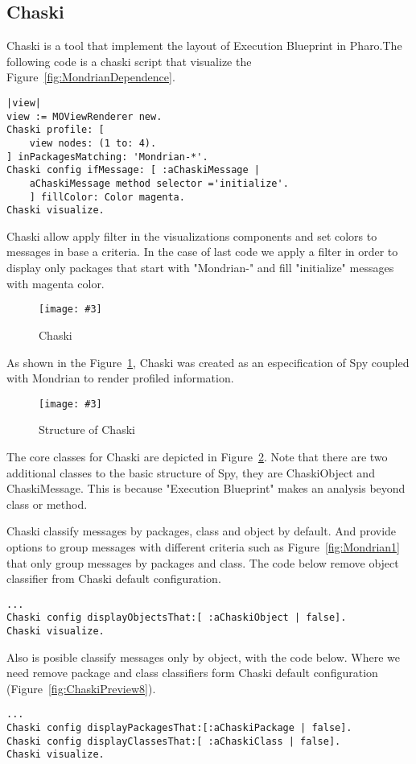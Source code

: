 \documentclass{sig-alternate}
\newcommand{\fig}[4]{
	\begin{figure}[#1]
		\centering
		\texttt{[image: \#3]}
		\caption{\label{fig:#3}#4}
	\end{figure}}
\newcommand{\figref}[1]{Figure~\ref{fig:#1}}
\begin{document}
\subsection{Chaski}

Chaski is a tool that implement the layout of Execution Blueprint in Pharo.The following code is a chaski script that visualize the \figref{MondrianDependence}.
 
\begin{lstlisting}[language=Smalltalk]
|view|
view := MOViewRenderer new. 
Chaski profile: [ 	
	view nodes: (1 to: 4). 
] inPackagesMatching: 'Mondrian-*'.
Chaski config ifMessage: [ :aChaskiMessage | 
	aChaskiMessage method selector ='initialize'.
	] fillColor: Color magenta.
Chaski visualize.
\end{lstlisting}

Chaski allow apply filter in the visualizations components and set colors to messages in base a criteria. In the case of last code we apply a filter in order to display only packages that start with "Mondrian-" and fill "initialize" messages with magenta color.

\fig{}{0.3}{Architecture}{Chaski}

As shown in the \figref{Architecture}, Chaski was created as an especification of Spy coupled with Mondrian to render profiled information.

\fig{}{0.5}{ObjectModel}{Structure of Chaski}

The core classes for Chaski are depicted in \figref{ObjectModel}. Note that there are two additional classes to the basic structure of Spy, they are ChaskiObject and ChaskiMessage. This is because "Execution Blueprint" makes an analysis beyond class or method.

Chaski classify messages by packages, class and object by default. And provide options to group messages with different criteria such as \figref{Mondrian1} that only group messages by packages and class. The code below remove object classifier from Chaski default configuration.
\begin{lstlisting}[language=Smalltalk]
...
Chaski config displayObjectsThat:[ :aChaskiObject | false].
Chaski visualize.
\end{lstlisting}

Also is posible classify messages only by object, with the code below. Where we need remove package and class classifiers form Chaski default configuration (\figref{ChaskiPreview8}).
\begin{lstlisting}[language=Smalltalk]
...
Chaski config displayPackagesThat:[:aChaskiPackage | false].
Chaski config displayClassesThat:[ :aChaskiClass | false].
Chaski visualize.
\end{lstlisting}
\end{document}
